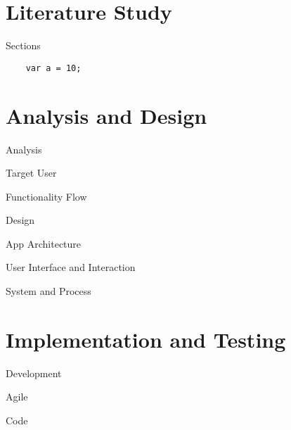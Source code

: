 \documentclass[10pt, compress]{beamer}
\begin{document}
\section{Literature Study}


\begin{frame}{Sections}

  \begin{verbatim}
    var a = 10;
  \end{verbatim}

\end{frame}


\section{Analysis and Design}


\begin{frame}{Analysis}
  
  Target User
  
  Functionality Flow

\end{frame}


\begin{frame}{Design}
  
  App Architecture
  
  User Interface and Interaction
  
  System and Process

\end{frame}


\section{Implementation and Testing}


\begin{frame}{Development}

  Agile
  
  Code

\end{frame}
\end{document}
